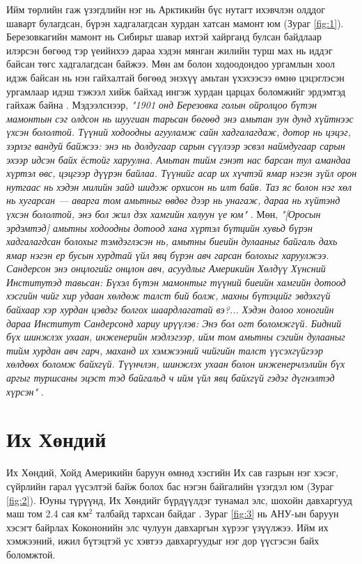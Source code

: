 \documentclass[10pt,twocolumn,letterpaper]{article}
\begin{document}
Ийм төрлийн гаж үзэгдлийн нэг нь Арктикийн бүс нутагт ихэвчлэн олддог шаварт булагдсан, бүрэн хадгалагдсан хурдан хатсан мамонт юм (Зураг \ref{fig:1}). Березовкагийн мамонт нь Сибирьт шавар ихтэй хайрганд булсан байдлаар илэрсэн бөгөөд тэр үеийнхээ дараа хэдэн мянган жилийн турш мах нь иддэг байсан төгс хадгалагдсан байжээ. Мөн ам болон ходоодондоо ургамлын хоол идэж байсан нь нэн гайхалтай бөгөөд энэхүү амьтан үхэхээсээ өмнө цэцэглэсэн ургамлаар идэш тэжээл хийж байхад ингэж хурдан царцах боломжийг эрдэмтэд гайхаж байна \cite{17}. Мэдээлснээр, \textit{"1901 онд Березовка голын ойролцоо бүтэн мамонтын сэг олдсон нь шуугиан тарьсан бөгөөд энэ амьтан зун дунд хүйтнээс үхсэн бололтой. Түүний ходоодны агууламж сайн хадгалагдаж, дотор нь цэцэг, зэрлэг вандуй байжээ: энэ нь долдугаар сарын сүүлээр эсвэл наймдугаар сарын эхээр идсэн байх ёстойг харуулна. Амьтан тийм гэнэт нас барсан тул амандаа хүртэл өвс, цэцгээр дүүрэн байлаа. Түүнийг асар их хүчтэй ямар нэгэн зүйл орон нутгаас нь хэдэн милийн зайд шидэж орхисон нь илт байв. Таз яс болон нэг хөл нь хугарсан — аварга том амьтныг өвдөг дээр нь унагаж, дараа нь хүйтэнд үхсэн бололтой, энэ бол жил дэх хамгийн халуун үе юм"} \cite{18}. Мөн, \textit{"[Оросын эрдэмтэд] амьтны ходоодны дотоод хана хүртэл бүтцийн хувьд бүрэн хадгалагдсан болохыг тэмдэглэсэн нь, амьтны биеийн дулааныг байгаль дахь ямар нэгэн ер бусын хурдтай үйл явц бүрэн авч гарсан болохыг харуулжээ. Сандерсон энэ онцлогийг онцлон авч, асуудлыг Америкийн Хөлдүү Хүнсний Институтэд тавьсан: Бүхэл бүтэн мамонтыг түүний биеийн хамгийн дотоод хэсгийн чийг хир удаан хөлдөж талст бий болж, махны бүтэцийг эвдэхгүй байхаар хэр хурдан цэвдэг болгох шаардлагатай вэ?... Хэдэн долоо хоногийн дараа Институт Сандерсонд хариу ирүүлэв: Энэ бол огт боломжгүй. Бидний бүх шинжлэх ухаан, инженерийн мэдлэгээр, ийм том амьтны сэгийн дулааныг тийм хурдан авч гарч, маханд их хэмжээний чийгийн талст үүсэхгүйгээр хөлдөөх боломж байхгүй. Түүнчлэн, шинжлэх ухаан болон инженерчлэлийн бүх аргыг туршсаны эцэст тэд байгальд ч ийм үйл явц байхгүй гэдэг дүгнэлтэд хүрсэн"} \cite{19}.

\section{Их Хөндий}

Их Хөндий, Хойд Америкийн баруун өмнөд хэсгийн Их сав газрын нэг хэсэг, сүйрлийн гарал үүсэлтэй байж болох бас нэгэн байгалийн үзэгдэл юм (Зураг \ref{fig:2}). Юуны түрүүнд, Их Хөндийг бүрдүүлдэг тунамал элс, шохойн давхаргууд маш том 2.4 сая км$^2$ талбайд тархсан байдаг \cite{21}. Зураг \ref{fig:3} нь АНУ-ын баруун хэсэгт байрлах Кокононийн элс чулуун давхаргын хүрээг үзүүлжээ. Ийм их хэмжээний, ижил бүтэцтэй ус хэвтээ давхаргуудыг нэг дор үүсгэсэн байх боломжтой.
\end{document}
